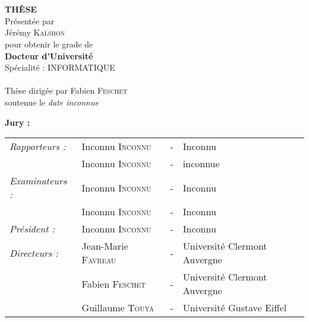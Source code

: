 

\begin{titlepage}
\begin{center}
 \\
\vspace*{0.3cm}
 \\
\vspace*{0.5cm}
\noindent \Huge \textbf{THÈSE} \\
\vspace*{0.3cm}
\noindent \large {Présentée par\\}
\noindent \LARGE Jérémy \textsc{Kalsron} \\
\vspace*{0.8cm}
\noindent \large {pour obtenir le grade de} \\
\noindent \LARGE \textbf{Docteur d'Université} \\
\vspace*{0.3cm}
\noindent \large {Spécialité : INFORMATIQUE} \\
\vspace*{0.8cm}
 \\
\vspace*{0.8cm}
\noindent \Large Thèse dirigée par Fabien \textsc{Feschet} \\
\vspace*{0.2cm}
\noindent \large soutenue le \textit{date inconnue} \\
\vspace*{0.2cm}
\end{center}
\noindent \large \textbf{Jury :} \\
\begin{center}
\noindent \large 
\begin{tabular}{llcl}
      \textit{Rapporteurs :}	& Inconnu \textsc{Inconnu}		& - & Inconnu \\
                              & Inconnu \textsc{Inconnu}		& - & inconnue \\
      \textit{Examinateurs :} & Inconnu \textsc{Inconnu}		& - & Inconnu \\
                              & Inconnu \textsc{Inconnu}		& - & Inconnu \\
      \textit{Président :}	& Inconnu \textsc{Inconnu}		& - & Inconnu \\
      \textit{Directeurs :}	& Jean-Marie \textsc{Favreau}		& - & Université Clermont Auvergne \\
                              & Fabien \textsc{Feschet}		& - & Université Clermont Auvergne\\
                              & Guillaume \textsc{Touya}		& - & Université Gustave Eiffel \\
\end{tabular}
\end{center}
\end{titlepage}

\sloppy

\titlepage
